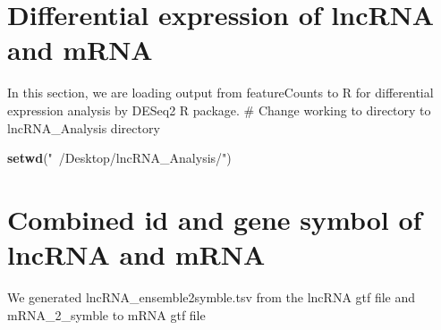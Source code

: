 \documentclass[]{article}
\newenvironment{Shaded}{\begin{snugshade}}{\end{snugshade}}
\newcommand{\DecValTok}[1]{\textcolor[rgb]{0.00,0.00,0.81}{#1}}
\newcommand{\KeywordTok}[1]{\textcolor[rgb]{0.13,0.29,0.53}{\textbf{#1}}}
\newcommand{\NormalTok}[1]{#1}
\newcommand{\OperatorTok}[1]{\textcolor[rgb]{0.81,0.36,0.00}{\textbf{#1}}}
\newcommand{\StringTok}[1]{\textcolor[rgb]{0.31,0.60,0.02}{#1}}
\begin{document}
\hypertarget{differential-expression-of-lncrna-and-mrna}{%
\section{Differential expression of lncRNA and
mRNA}\label{differential-expression-of-lncrna-and-mrna}}

In this section, we are loading output from featureCounts to R for
differential expression analysis by DESeq2 R package. \# Change working
to directory to lncRNA\_Analysis directory

\begin{Shaded}
\begin{Highlighting}[]
\KeywordTok{setwd}\NormalTok{(}\StringTok{"~/Desktop/lncRNA_Analysis/"}\NormalTok{)}
\end{Highlighting}
\end{Shaded}

\hypertarget{combined-id-and-gene-symbol-of-lncrna-and-mrna}{%
\section{Combined id and gene symbol of lncRNA and
mRNA}\label{combined-id-and-gene-symbol-of-lncrna-and-mrna}}

We generated lncRNA\_ensemble2symble.tsv from the lncRNA gtf file and
mRNA\_2\_symble to mRNA gtf file

\begin{Shaded}
\end{Shaded}
\end{document}
